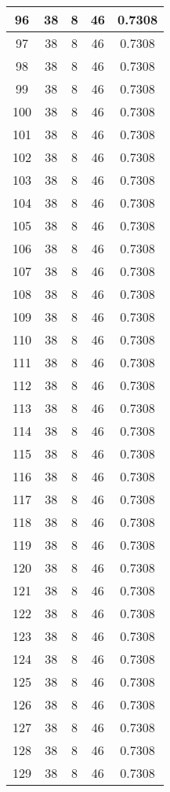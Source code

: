\documentclass[letterpaper, 12pt]{article}
\begin{document}
\begin{longtable}{|c|c|c|c|c|}
\hline
96 & 38 & 8 & 46 & 0.7308 \\
\hline
97 & 38 & 8 & 46 & 0.7308 \\
\hline
98 & 38 & 8 & 46 & 0.7308 \\
\hline
99 & 38 & 8 & 46 & 0.7308 \\
\hline
100 & 38 & 8 & 46 & 0.7308 \\
\hline
101 & 38 & 8 & 46 & 0.7308 \\
\hline
102 & 38 & 8 & 46 & 0.7308 \\
\hline
103 & 38 & 8 & 46 & 0.7308 \\
\hline
104 & 38 & 8 & 46 & 0.7308 \\
\hline
105 & 38 & 8 & 46 & 0.7308 \\
\hline
106 & 38 & 8 & 46 & 0.7308 \\
\hline
107 & 38 & 8 & 46 & 0.7308 \\
\hline
108 & 38 & 8 & 46 & 0.7308 \\
\hline
109 & 38 & 8 & 46 & 0.7308 \\
\hline
110 & 38 & 8 & 46 & 0.7308 \\
\hline
111 & 38 & 8 & 46 & 0.7308 \\
\hline
112 & 38 & 8 & 46 & 0.7308 \\
\hline
113 & 38 & 8 & 46 & 0.7308 \\
\hline
114 & 38 & 8 & 46 & 0.7308 \\
\hline
115 & 38 & 8 & 46 & 0.7308 \\
\hline
116 & 38 & 8 & 46 & 0.7308 \\
\hline
117 & 38 & 8 & 46 & 0.7308 \\
\hline
118 & 38 & 8 & 46 & 0.7308 \\
\hline
119 & 38 & 8 & 46 & 0.7308 \\
\hline
120 & 38 & 8 & 46 & 0.7308 \\
\hline
121 & 38 & 8 & 46 & 0.7308 \\
\hline
122 & 38 & 8 & 46 & 0.7308 \\
\hline
123 & 38 & 8 & 46 & 0.7308 \\
\hline
124 & 38 & 8 & 46 & 0.7308 \\
\hline
125 & 38 & 8 & 46 & 0.7308 \\
\hline
126 & 38 & 8 & 46 & 0.7308 \\
\hline
127 & 38 & 8 & 46 & 0.7308 \\
\hline
128 & 38 & 8 & 46 & 0.7308 \\
\hline
129 & 38 & 8 & 46 & 0.7308 \\

\end{longtable}
\end{document}
